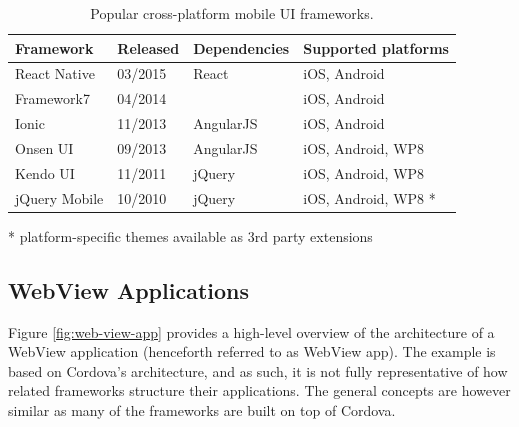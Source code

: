 \documentclass[thesis.tex]{subfiles}
\begin{document}
\begin{table}[hb]
	\caption{Popular cross-platform mobile UI frameworks.} \label{table:cross-platform-mobile-ui-frameworks}

	\begin{center}
	\begin{tabular}{| m{3.05cm} | m{1.75cm} | m{2.75cm} | m{4.25cm} |}

		\hline
		\textbf{Framework}	&	\textbf{Released}		&		\textbf{Dependencies}		&	\textbf{Supported platforms}		\\ \hline
		React Native		&	03/2015						&	React						&	iOS, Android						\\ \hline
		Framework7 			&	04/2014						&								&	iOS, Android						\\ \hline
		Ionic				&	11/2013						&	AngularJS					&	iOS, Android						\\ \hline
		Onsen UI			&	09/2013						&	AngularJS					&	iOS, Android, WP8					 \\ \hline
		Kendo UI			&	11/2011						&	jQuery						&	iOS, Android, WP8					\\ \hline
		jQuery Mobile 		&	10/2010						&	jQuery						&	iOS, Android, WP8 \footnotesize{*}	\\ \hline

	\end{tabular}
	\end{center}
	\scriptsize{*} \small{platform-specific themes available as 3rd party extensions}
\end{table}

\subsection{WebView Applications}

Figure \ref{fig:web-view-app} provides a high-level overview of the architecture of a WebView application (henceforth referred to as WebView app). The example is based on Cordova's architecture, and as such, it is not fully representative of how related frameworks structure their applications. The general concepts are however similar as many of the frameworks are built on top of Cordova.
\end{document}
